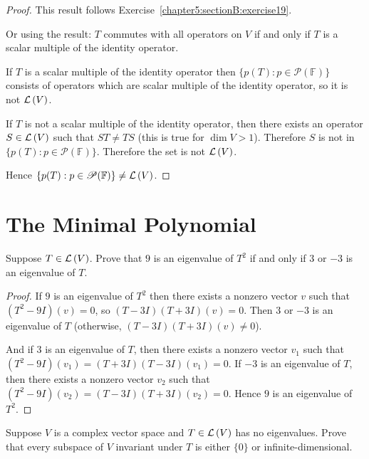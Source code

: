 \begin{proof}
    This result follows Exercise~\ref{chapter5:sectionB:exercise19}.
    \bigskip

    Or using the result: $T$ commutes with all operators on $V$ if and only if $T$ is a scalar multiple of the identity operator.

    If $T$ is a scalar multiple of the identity operator then $\{ p(T): p\in\mathscr{P}(\mathbb{F}) \}$ consists of operators which are scalar multiple of the identity operator, so it is not $\mathcal{L}\left({V}\right)$.

    If $T$ is not a scalar multiple of the identity operator, then there exists an operator $S\in\mathcal{L}\left({V}\right)$ such that $ST\ne TS$ (this is true for $\dim V > 1$). Therefore $S$ is not in $\{ p(T): p\in\mathscr{P}(\mathbb{F}) \}$. Therefore the set is not $\mathcal{L}\left({V}\right)$.

    Hence $\{ p(T): p\in\mathscr{P}(\mathbb{F}) \}\ne \mathcal{L}\left({V}\right)$.
\end{proof}
\newpage

\section{The Minimal Polynomial}

\begin{exercise}
    Suppose $T\in \mathcal{L}\left({V}\right)$. Prove that $9$ is an eigenvalue of $T^{2}$ if and only if $3$ or $-3$ is an eigenvalue of $T$.
\end{exercise}

\begin{proof}
    If $9$ is an eigenvalue of $T^{2}$ then there exists a nonzero vector $v$ such that $(T^{2} - 9I)(v) = 0$, so $(T - 3I)(T + 3I)(v) = 0$. Then $3$ or $-3$ is an eigenvalue of $T$ (otherwise, $(T - 3I)(T + 3I)(v) \ne 0$).

    And if $3$ is an eigenvalue of $T$, then there exists a nonzero vector $v_{1}$ such that $(T^{2} - 9I)(v_{1}) = (T + 3I)(T - 3I)(v_{1}) = 0$. If $-3$ is an eigenvalue of $T$, then there exists a nonzero vector $v_{2}$ such that $(T^{2} - 9I)(v_{2}) = (T - 3I)(T + 3I)(v_{2}) = 0$. Hence $9$ is an eigenvalue of $T^{2}$.
\end{proof}
\newpage

\begin{exercise}
    Suppose $V$ is a complex vector space and $T\in\mathcal{L}\left({V}\right)$ has no eigenvalues. Prove that every subspace of $V$ invariant under $T$ is either $\{0\}$ or infinite-dimensional.
\end{exercise}

